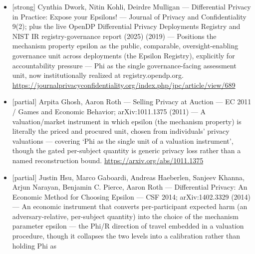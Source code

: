 \documentclass[
  11pt,
]{article}
\begin{document}
\begin{itemize}
  DAS: DSEP committee sets the privacy-loss budget in response to the
  reconstruction attack) (2020) --- A deployed governance process in
  which a per-subject reconstruction threat (the 2010 census
  reconstruction attack --- the R-level event) is governed by
  deliberating and setting the mechanism property epsilon (the Phi-level
  unit) via a policy committee (DSEP/DRB). The assessment/decision unit
  is Phi; reconstruction risk is what it gates. Institutional practice
  of the exact composition, minus the word `valuation'.
  \url{https://www.census.gov/content/dam/Census/library/working-papers/2020/adrm/The\%20modernization\%20of\%20statistical\%20disclosure\%20limitation\%20at\%20the\%20U.S.\%20Census\%20Bureau.pdf}
\item
  {[}strong{]} Cynthia Dwork, Nitin Kohli, Deirdre Mulligan ---
  Differential Privacy in Practice: Expose your Epsilons! --- Journal of
  Privacy and Confidentiality 9(2); plus the live OpenDP Differential
  Privacy Deployments Registry and NIST IR registry-governance report
  (2025) (2019) --- Positions the mechanism property epsilon as the
  public, comparable, oversight-enabling governance unit across
  deployments (the Epsilon Registry), explicitly for accountability
  pressure --- Phi as the single governance-facing assessment unit, now
  institutionally realized at registry.opendp.org.
  \url{https://journalprivacyconfidentiality.org/index.php/jpc/article/view/689}
\item
  {[}partial{]} Arpita Ghosh, Aaron Roth --- Selling Privacy at Auction
  --- EC 2011 / Games and Economic Behavior; arXiv:1011.1375 (2011) ---
  A valuation/market instrument in which epsilon (the mechanism
  property) is literally the priced and procured unit, chosen from
  individuals' privacy valuations --- covering `Phi as the single unit
  of a valuation instrument', though the gated per-subject quantity is
  generic privacy loss rather than a named reconstruction bound.
  \url{https://arxiv.org/abs/1011.1375}
\item
  {[}partial{]} Justin Hsu, Marco Gaboardi, Andreas Haeberlen, Sanjeev
  Khanna, Arjun Narayan, Benjamin C. Pierce, Aaron Roth --- Differential
  Privacy: An Economic Method for Choosing Epsilon --- CSF 2014;
  arXiv:1402.3329 (2014) --- An economic instrument that converts
  per-participant expected harm (an adversary-relative, per-subject
  quantity) into the choice of the mechanism parameter epsilon --- the
  Phi/R direction of travel embedded in a valuation procedure, though it
  collapses the two levels into a calibration rather than holding Phi as

\end{itemize}
\end{document}
